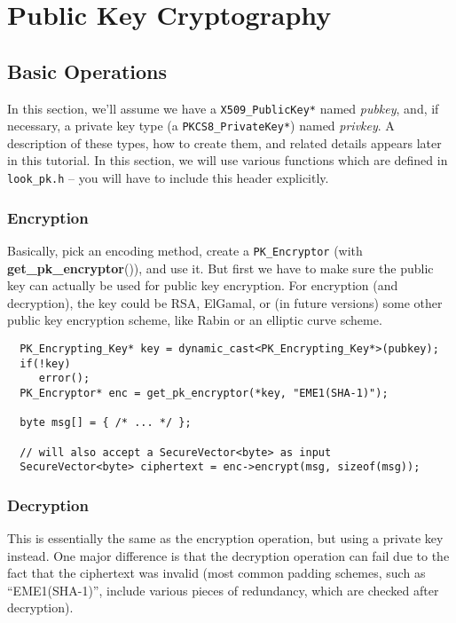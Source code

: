 \documentclass{article}
\newcommand{\filename}[1]{\texttt{#1}}
\newcommand{\function}[1]{\textbf{#1}}
\newcommand{\type}[1]{\texttt{#1}}
\renewcommand{\arg}[1]{\textsl{#1}}
\begin{document}
\pagebreak

\section{Public Key Cryptography}

\subsection{Basic Operations}

In this section, we'll assume we have a \type{X509\_PublicKey*} named
\arg{pubkey}, and, if necessary, a private key type (a
\type{PKCS8\_PrivateKey*}) named \arg{privkey}. A description of these types,
how to create them, and related details appears later in this tutorial. In this
section, we will use various functions which are defined in
\filename{look\_pk.h} -- you will have to include this header explicitly.

\subsubsection{Encryption}

Basically, pick an encoding method, create a \type{PK\_Encryptor} (with
\function{get\_pk\_encryptor}()), and use it. But first we have to make sure
the public key can actually be used for public key encryption. For encryption
(and decryption), the key could be RSA, ElGamal, or (in future versions) some
other public key encryption scheme, like Rabin or an elliptic curve scheme.

\begin{verbatim}
  PK_Encrypting_Key* key = dynamic_cast<PK_Encrypting_Key*>(pubkey);
  if(!key)
     error();
  PK_Encryptor* enc = get_pk_encryptor(*key, "EME1(SHA-1)");

  byte msg[] = { /* ... */ };

  // will also accept a SecureVector<byte> as input
  SecureVector<byte> ciphertext = enc->encrypt(msg, sizeof(msg));
\end{verbatim}

\subsubsection{Decryption}

This is essentially the same as the encryption operation, but using a private
key instead. One major difference is that the decryption operation can fail due
to the fact that the ciphertext was invalid (most common padding schemes, such
as ``EME1(SHA-1)'', include various pieces of redundancy, which are checked
after decryption).
\end{document}
